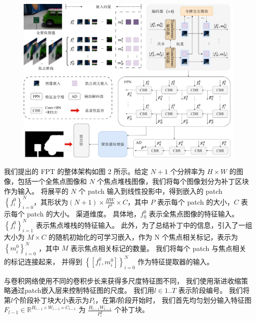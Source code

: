 %
%
%
%
\begin{figure}[!ht]
	\centering
	\includegraphics[width=0.95\linewidth]{figures/chapter3/overview_1}
	\label{cpt3_fig1:overview}
\end{figure}
%
%
%
%
%
我们提出的 FPT 的整体架构如图 2 所示。给定 $N + 1$ 个分辨率为 $ H \times W $ 的图像，包括一个全焦点图像和 $N$ 个焦点堆栈图像，我们将每个图像划分为补丁区块作为输入。 
将展平的 $N$ 个 patch 输入到线性投影中，得到嵌入的 patch $ \left \{ f_{i}^{0} \right \}_{i=0}^{N} $，其形状为$ \left ( N + 1 \right ) \times \frac{HW}{P^{2}} \times C  $，其中 $P$ 表示每个 patch 的大小，$C$ 表示每个 patch 的大小。 
渠道维度。 
%
%
%
具体地，$ f_{0}^{0} $ 表示全焦点图像的特征输入。 
$ \left \{ f_{i}^{0} \right \}_{i=1}^{N} $ 表示焦点堆栈的特征输入。 
此外，为了总结补丁中的信息，引入了一组大小为 $ M \times C $ 的随机初始化的可学习嵌入，作为 { }N 个焦点相关标记，表示为 $ \left \{ m_{i}^{0} \right \}_{i=0}^{N} $ ，其中 $M$ 表示焦点相关标记的数量。 
我们将每个 patch 与焦点相关的标记连接起来，
并得到 $ \left \{ \left [ f_{i}^{0},m_{i}^{0}  \right ]  \right \}_{i=0}^{N} $ 作为特征提取器的输入。 
%
%
%
%
%
\par
%
%
与卷积网络使用不同的卷积步长来获得多尺度特征图不同，
我们使用渐进收缩策略通过patch嵌入层来控制特征图的尺度。
我们用$ l \in 1..T $ 表示阶段编号。 
我们将第$l$个阶段补丁块大小表示为$P_{l}$，在第$l$阶段开始时，
我们首先均匀划分输入特征图
$F_{l-1} \in \mathbb{R}^{H_{l-1} \times W_{l-1} \times C_{l-1}}$
为
$ \frac{H_{l-1}W_{l-1}}{P_{l}^{2}} $
个补丁块。

